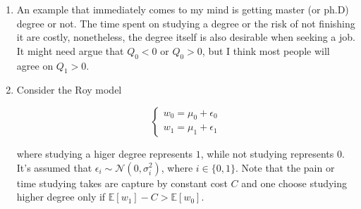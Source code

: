\documentclass[11pt]{article}
\newcommand{\ept}{\mathbb{E}}
\newcommand{\normal}{\mathcal{N}}
\begin{document}
    \begin{enumerate}

        \item An example that immediately comes to my mind is getting master (or ph.D) degree or not. The time spent on studying a degree or the risk of not finishing it are costly, nonetheless, the degree itself is also desirable when seeking a job. It might need argue that $Q_0 < 0$ or $Q_0 > 0$, but I think most people will agree on $Q_1 > 0$.
        
        \item Consider the Roy model
        
        \[ 
            \left\{ \begin{aligned}
            w_0 = \mu_0 + \epsilon_0 \\
            w_1 = \mu_1 + \epsilon_1
            \end{aligned} \right.
        \]

        where studying a higer degree represents $1$, while not studying represents $0$. It's assumed that $\epsilon_i \sim \normal(0, \sigma_i^2)$, where $i \in \{0,1\}$.  Note that the pain or time studying takes are capture by constant cost $C$ and one choose studying higher degree only if $\ept[w_1] - C > \ept[w_0]$.
        
    \end{enumerate}



    
\end{document}
